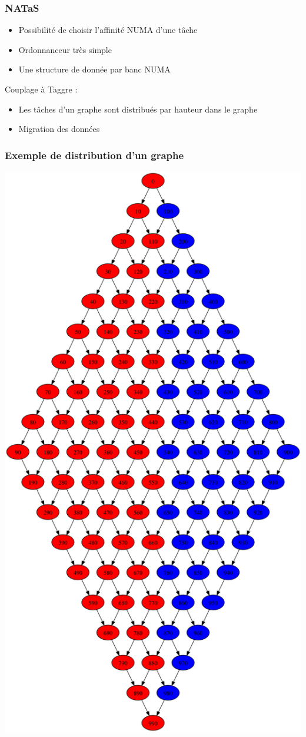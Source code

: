 \documentclass{beamer}
\begin{document}
\begin{frame}
  \frametitle{NATaS}

  \begin{itemize}
    \item Possibilité de choisir l'affinité NUMA d'une tâche
    \item Ordonnanceur très simple
    \item Une structure de donnée par banc NUMA
  \end{itemize}

  \pause

  Couplage à Taggre :
  \begin{itemize}
    \item Les tâches d'un graphe sont distribués par hauteur dans le graphe
    \item Migration des données
  \end{itemize}

\end{frame}

\begin{frame}
  \frametitle{Exemple de distribution d'un graphe}

  \centerline{\includegraphics[width=0.35\linewidth]{numa_dist}}

\end{frame}
\end{document}
